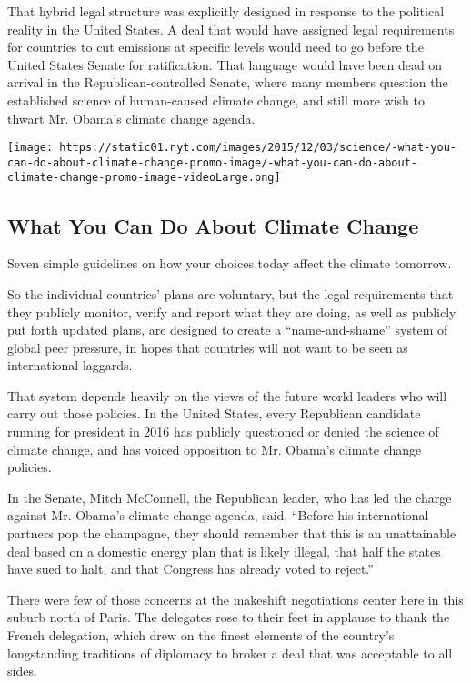 That hybrid legal structure was explicitly designed in response to the
political reality in the United States. A deal that would have assigned
legal requirements for countries to cut emissions at specific levels
would need to go before the United States Senate for ratification. That
language would have been dead on arrival in the Republican-controlled
Senate, where many members question the established science of
human-caused climate change, and still more wish to thwart Mr. Obama's
climate change agenda.

\href{https://www.nytimes.com/interactive/2015/12/03/upshot/what-you-can-do-about-climate-change.html}{}

\texttt{[image: https://static01.nyt.com/images/2015/12/03/science/-what-you-can-do-about-climate-change-promo-image/-what-you-can-do-about-climate-change-promo-image-videoLarge.png]}

\hypertarget{what-you-can-do-about-climate-change}{%
\subsection{What You Can Do About Climate
Change}\label{what-you-can-do-about-climate-change}}

Seven simple guidelines on how your choices today affect the climate
tomorrow.

So the individual countries' plans are voluntary, but the legal
requirements that they publicly monitor, verify and report what they are
doing, as well as publicly put forth updated plans, are designed to
create a ``name-and-shame'' system of global peer pressure, in hopes
that countries will not want to be seen as international laggards.

That system depends heavily on the views of the future world leaders who
will carry out those policies. In the United States, every Republican
candidate running for president in 2016 has publicly questioned or
denied the science of climate change, and has voiced opposition to Mr.
Obama's climate change policies.

In the Senate, Mitch McConnell, the Republican leader, who has led the
charge against Mr. Obama's climate change agenda, said, ``Before his
international partners pop the champagne, they should remember that this
is an unattainable deal based on a domestic energy plan that is likely
illegal, that half the states have sued to halt, and that Congress has
already voted to reject.''

There were few of those concerns at the makeshift negotiations center
here in this suburb north of Paris. The delegates rose to their feet in
applause to thank the French delegation, which drew on the finest
elements of the country's longstanding traditions of diplomacy to broker
a deal that was acceptable to all sides.

